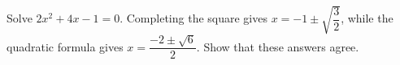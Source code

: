 Solve \(2x^2+4x-1=0\). Completing the square gives \(x=-1\pm\sqrt{\dfrac{3}{2}}\), while the quadratic formula gives \(x=\dfrac{-2\pm\sqrt6}{2}\). Show that these answers agree.

